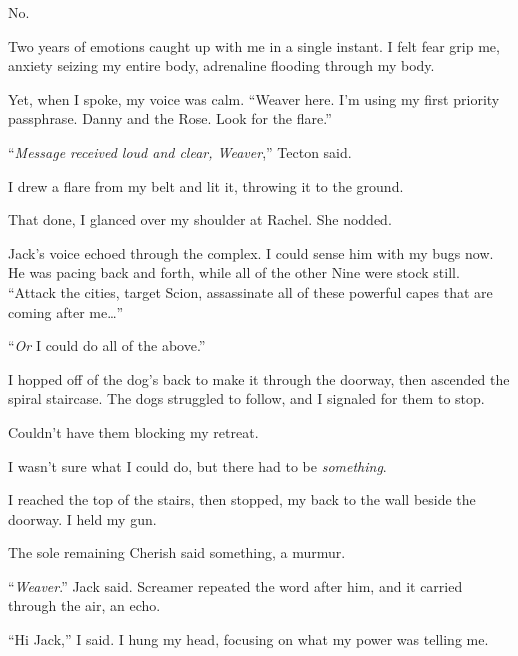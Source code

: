 No.



Two years of emotions caught up with me in a single instant.  I felt fear grip me, anxiety seizing my entire body, adrenaline flooding through my body.



Yet, when I spoke, my voice was calm.  ``Weaver here.  I'm using my first priority passphrase.  Danny and the Rose.  Look for the flare.''



``\emph{Message received loud and clear, Weaver},'' Tecton said.



I drew a flare from my belt and lit it, throwing it to the ground.



That done, I glanced over my shoulder at Rachel.  She nodded.



Jack's voice echoed through the complex.  I could sense him with my bugs now.  He was pacing back and forth, while all of the other Nine were stock still.  ``Attack the cities, target Scion, assassinate all of these powerful capes that are coming after me\ldots''



``\emph{Or} I could do all of the above.''



I hopped off of the dog's back to make it through the doorway, then ascended the spiral staircase.  The dogs struggled to follow, and I signaled for them to stop.



Couldn't have them blocking my retreat.



I wasn't sure what I could do, but there had to be \emph{something}.



I reached the top of the stairs, then stopped, my back to the wall beside the doorway.  I held my gun.



The sole remaining Cherish said something, a murmur.



``\emph{Weaver}.'' Jack said.  Screamer repeated the word after him, and it carried through the air, an echo.



``Hi Jack,'' I said.  I hung my head, focusing on what my power was telling me.




